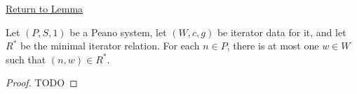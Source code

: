 \newpage
{}
\label{prf:minimal-iterator-relation-deterministic}

\begin{remark*}[Return]
\hyperref[lem:minimal-iterator-relation-deterministic]{Return to Lemma}
\end{remark*}

\begin{theorem*}
Let $(P,S,1)$ be a Peano system, let $(W,c,g)$ be iterator data for it, and let
$R^*$ be the minimal iterator relation. For each $n\in P$, there is at most one
$w\in W$ such that $(n,w)\in R^*$.
\end{theorem*}

\begin{proof}
TODO
\end{proof}
